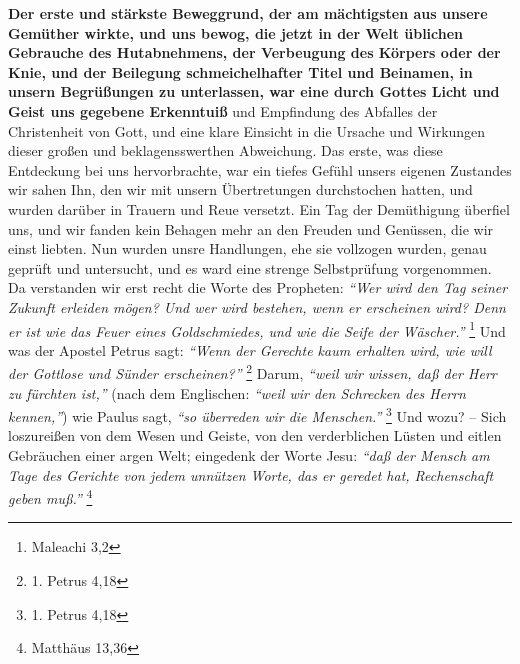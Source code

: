 \label{ref:09_05_offenbarung} \textbf{Der erste und stärkste Beweggrund, der am mächtigsten aus unsere
Gemüther
wirkte, und uns bewog, die jetzt in der Welt üblichen Gebrauche des
Hutabnehmens, der Verbeugung des Körpers oder der Knie, und
der Beilegung
schmeichelhafter Titel und Beinamen, in unsern Begrüßungen zu unterlassen, war
eine durch Gottes Licht und Geist uns gegebene Erkenntuiß}
und Empfindung des
Abfalles der Christenheit von Gott, und eine klare Einsicht in die Ursache und
Wirkungen dieser großen und beklagensswerthen Abweichung. Das erste, was diese
Entdeckung bei uns hervorbrachte, war ein tiefes Gefühl unsers eigenen Zustandes
wir sahen Ihn, den wir mit unsern Übertretungen durchstochen hatten, und wurden
darüber in Trauern und Reue versetzt. Ein Tag der Demüthigung
überfiel uns, und
wir fanden kein Behagen mehr an den Freuden und Genüssen, die wir einst liebten.
Nun wurden unsre Handlungen, ehe sie vollzogen wurden, genau geprüft und
untersucht, und es ward eine strenge Selbstprüfung
vorgenommen. Da verstanden
wir erst recht die Worte des Propheten:
\textit{"`Wer wird den Tag seiner Zukunft
erleiden mögen? Und wer wird bestehen, wenn er erscheinen wird? Denn er ist wie
das Feuer eines Goldschmiedes, und wie die Seife der Wäscher."'}
\footnote{Maleachi 3,2}
Und was der Apostel Petrus sagt:
\textit{"`Wenn der Gerechte kaum erhalten wird, wie will der Gottlose und Sünder
erscheinen?"'}
\footnote{1. Petrus 4,18}
Darum,
\textit{"`weil wir wissen, daß der Herr zu fürchten ist,"'}
(nach dem Englischen:
\textit{"`weil wir den Schrecken des Herrn kennen,"'}) wie Paulus sagt,
\textit{"`so überreden wir die Menschen."'}
\footnote{1. Petrus 4,18}
Und wozu? -- Sich loszureißen von dem Wesen
und Geiste, von den verderblichen Lüsten und eitlen Gebräuchen einer argen Welt;
eingedenk der Worte Jesu:
\textit{"`daß der Mensch am Tage des Gerichte von jedem
unnützen Worte, das er geredet hat, Rechenschaft geben muß."'}
\footnote{Matthäus 13,36}

\medskip

